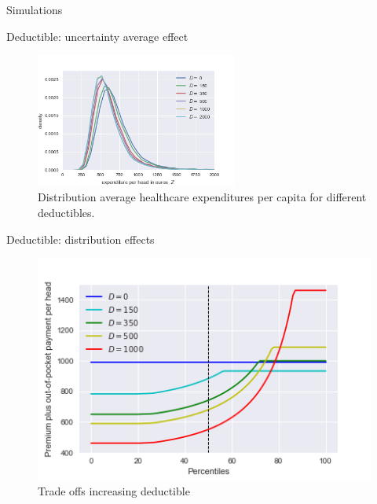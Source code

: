 \documentclass[presentation]{beamer}
\begin{document}
\begin{frame}[label={sec:org529e4a1}]{Simulations}
\begin{block}{Deductible: uncertainty average effect}
\begin{figure}[htbp]
\centering
\includegraphics[width=250px]{./Density_plots_simulation_deductibles_healthy_Male.png}
\caption{\label{fig:exp_deduc}
Distribution average healthcare expenditures per capita for different deductibles.}
\end{figure}
\end{block}


\begin{block}{Deductible: distribution effects}
\begin{figure}[htbp]
\centering
\includegraphics[width=900px]{./deciles_deductible_male_female_Healthy.png}
\caption{Trade offs increasing deductible}
\end{figure}
\end{block}
\end{frame}
\end{document}
